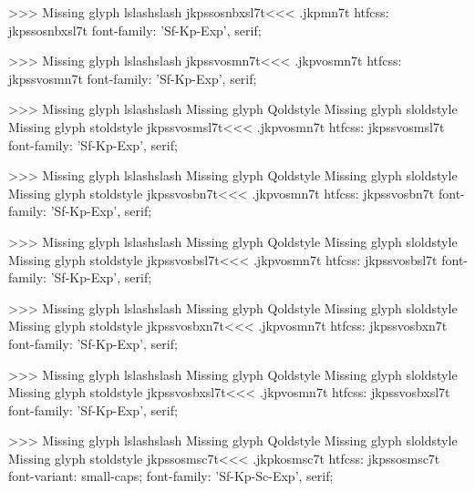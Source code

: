 >>>
Missing glyph	lslashslash
\<jkpssosnbxsl7t\><<<
.jkpmn7t
htfcss:  jkpssosnbxsl7t  font-family: 'Sf-Kp-Exp', serif;

>>>
Missing glyph	lslashslash
\<jkpssvosmn7t\><<<
.jkpvosmn7t
htfcss:  jkpssvosmn7t  font-family: 'Sf-Kp-Exp', serif;

>>>
Missing glyph	lslashslash
Missing glyph	Qoldstyle
Missing glyph	sloldstyle
Missing glyph	stoldstyle
\<jkpssvosmsl7t\><<<
.jkpvosmn7t
htfcss:  jkpssvosmsl7t  font-family: 'Sf-Kp-Exp', serif;

>>>
Missing glyph	lslashslash
Missing glyph	Qoldstyle
Missing glyph	sloldstyle
Missing glyph	stoldstyle
\<jkpssvosbn7t\><<<
.jkpvosmn7t
htfcss:  jkpssvosbn7t  font-family: 'Sf-Kp-Exp', serif;

>>>
Missing glyph	lslashslash
Missing glyph	Qoldstyle
Missing glyph	sloldstyle
Missing glyph	stoldstyle
\<jkpssvosbsl7t\><<<
.jkpvosmn7t
htfcss:  jkpssvosbsl7t  font-family: 'Sf-Kp-Exp', serif;

>>>
Missing glyph	lslashslash
Missing glyph	Qoldstyle
Missing glyph	sloldstyle
Missing glyph	stoldstyle
\<jkpssvosbxn7t\><<<
.jkpvosmn7t
htfcss:  jkpssvosbxn7t  font-family: 'Sf-Kp-Exp', serif;

>>>
Missing glyph	lslashslash
Missing glyph	Qoldstyle
Missing glyph	sloldstyle
Missing glyph	stoldstyle
\<jkpssvosbxsl7t\><<<
.jkpvosmn7t
htfcss:  jkpssvosbxsl7t  font-family: 'Sf-Kp-Exp', serif;

>>>
Missing glyph	lslashslash
Missing glyph	Qoldstyle
Missing glyph	sloldstyle
Missing glyph	stoldstyle
\<jkpssosmsc7t\><<<
.jkpkosmsc7t
htfcss:  jkpssosmsc7t  font-variant: small-caps; font-family: 'Sf-Kp-Sc-Exp', serif;

